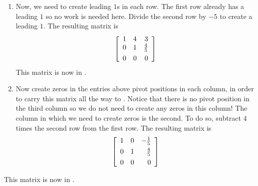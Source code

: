 \begin{solution}
\begin{enumerate}
\item Now, we need to create leading $1$s in each row. The first row already has a leading $1$ so no work is needed here.
Divide the second row by $-5$ to create a leading $1$. The resulting matrix is
\begin{equation*}
\leftB
\begin{array}{rrr}
1 & 4 & 3 \\
0 & 1 & \vspace{0.05in}\frac{4}{5} \\
0 & 0 & 0
\end{array}
\rightB
\end{equation*}
This matrix is now in \ef.

\item Now create zeros in the entries above pivot positions in each column, in order to carry this matrix all the way to \rref. 
Notice that there is no pivot position in the third column so we do not need to create any zeros in this column! The column in which we 
need to create zeros is the second. To do so, subtract $4$ times the second row from the first row. The resulting matrix is
\begin{equation*}
\leftB
\begin{array}{rrr}
1 & 0 & -\vspace{0.05in}\frac{1}{5} \\
0 & 1 & \vspace{0.05in}\frac{4}{5} \\
0 & 0 & 0
\end{array}
\rightB
\end{equation*}
\end{enumerate}
This matrix is now in \rref.
\end{solution}


